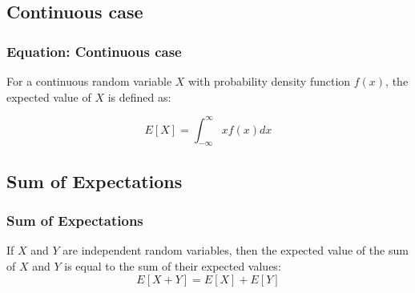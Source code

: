 \documentclass{beamer}
\begin{document}
    \subsection{Continuous case}\label{subsec:continuous}
    \begin{frame}
        \frametitle{Equation: Continuous case}
        For a continuous random variable $X$ with probability density function $f(x)$, the expected value of $X$ is defined as:
        \begin{block}{}
            \begin{equation}
                E[X] = \int_{-\infty}^{\infty} x f(x) dx\label{eq:equation3}
            \end{equation}
        \end{block}
    \end{frame}

    \subsection{Sum of Expectations}\label{subsec:sum}
    \begin{frame}
        \frametitle{Sum of Expectations}
        \begin{block}{}
            If $X$ and $Y$ are independent random variables, then the expected value of the sum of $X$ and $Y$ is equal to the sum of their expected values:
            \begin{equation}
                E[X+Y] = E[X] + E[Y]\label{eq:equation4}
            \end{equation}
        \end{block}
    \end{frame}
\end{document}
